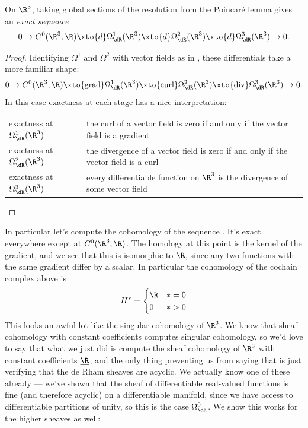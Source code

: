 \documentclass[11pt]{amsart}
\begin{document}
\begin{proposition} On $\R^3$, taking global sections of the resolution from the Poincar\'e lemma gives an \emph{exact sequence}
\begin{equation}\label{eqn:exact-seq-dR-on-R3}
\begin{aligned}
    0 \to C^0(\R^3,\R) \xto{d} \Omega^1_\dR(\R^3)\xto{d} \Omega^2_\dR(\R^3) \xto{d} \Omega^3_\dR(\R^3) \to 0.
\end{aligned}
\end{equation}
\end{proposition}
\begin{proof} Identifying $\Omega^1$ and $\Omega^2$ with vector fields as in , these differentials take a more familiar shape:
\begin{align*}
    0 \to C^0(\R^3,\R) \xto{\text{grad}} \Omega^1_\dR(\R^3)\xto{\text{curl}} \Omega^2_\dR(\R^3) \xto{\text{div}} \Omega^3_\dR(\R^3) \to 0.
\end{align*}
In this case exactness at each stage has a nice interpretation:
\begin{center}
    \begin{tabular}{| l | p{10cm} |}
    \hline
    exactness at $\Omega^1_\dR(\R^3)$ & the curl of a vector field is zero if and only if the vector field is a gradient \\
    exactness at $\Omega^2_\dR(\R^3)$ & the divergence of a vector field is zero if and only if the vector field is a curl \\
    exactness at $\Omega^3_\dR(\R^3)$ & every differentiable function on $\R^3$ is the divergence of some vector field \\
    \hline
\end{tabular}
\end{center}
\end{proof}
In particular let's compute the cohomology of the sequence . It's exact everywhere except at $C^0(\R^3,\R)$. The homology at this point is the kernel of the gradient, and we see that this is isomorphic to $\R$, since any two functions with the same gradient differ by a scalar. In particular the cohomology of the cochain complex above is
\begin{align*}
    H^\ast = \begin{cases} \R & \ast=0 \\ 0 & \ast>0 \end{cases}
\end{align*}
This looks an awful lot like the singular cohomology of $\R^3$. We know that sheaf cohomology with constant coefficients computes singular cohomology, so we'd love to say that what we just did is compute the sheaf cohomology of $\R^3$ with constant coefficients $\underline{\R}$, and the only thing preventing us from saying that is just verifying that the de Rham sheaves are acyclic. We actually know one of these already --- we've shown that the sheaf of differentiable real-valued functions is fine (and therefore acyclic) on a differentiable manifold, since we have access to differentiable partitions of unity, so this is the case $\Omega^0_\dR$. We show this works for the higher sheaves as well:
\end{document}
